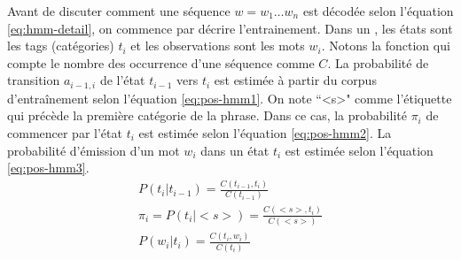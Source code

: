 \documentclass{KodeBook}
\begin{document}
Avant de discuter comment une séquence $w=w_1 \ldots w_n$ est décodée selon l'équation \ref{eq:hmm-detail}, on commence par décrire l'entrainement. 
Dans un , les états sont les tags (catégories) $t_i$ et les observations sont les mots $w_i$. 
Notons la fonction qui compte le nombre des occurrence d'une séquence comme $C$.
La probabilité de transition $a_{i-1,i}$ de l'état $t_{i-1}$ vers $t_i$ est estimée à partir du corpus d'entraînement selon l'équation \ref{eq:pos-hmm1}.
On note ``<s>" comme l'étiquette qui précède la première catégorie de la phrase. 
Dans ce cas, la probabilité $\pi_i$ de commencer par l'état $t_i$ est estimée selon l'équation \ref{eq:pos-hmm2}.
La probabilité d'émission d'un mot $w_i$ dans un état $t_i$ est estimée selon l'équation \ref{eq:pos-hmm3}.
\begin{align}
P(t_i | t_{i-1}) = \frac{C(t_{i-1}, t_i)}{C(t_{i-1})}  \label{eq:pos-hmm1} \\
\pi_i = P(t_i | <s>) = \frac{C(<s>, t_i)}{C(<s>)} \label{eq:pos-hmm2} \\
P(w_i | t_i) = \frac{C(t_i, w_i)}{C(t_i)} \label{eq:pos-hmm3}
\end{align}
\end{document}
